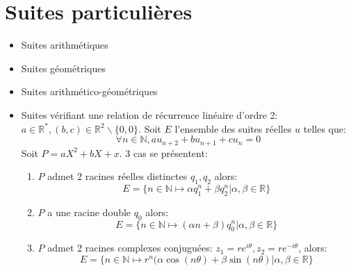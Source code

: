 \documentclass[fleqn]{article}
\begin{document}
\section{Suites particuli\`eres}
\begin{itemize}
	\item Suites arithm\'etiques
	\item Suites g\'eom\'etriques
	\item Suites arithm\'etico-g\'eom\'etriques
	\item Suites v\'erifiant une relation de r\'ecurrence lin\'eaire d'ordre 2: \\
		$a \in \mathbb{R}^*, (b,c) \in \mathbb{R}^2\backslash\{0,0\}$. Soit $E$ l'ensemble des suites r\'eelles $u$ telles que:
		\[\forall n \in \mathbb{N}, au_{n+2} + bu_{n+1} + cu_n = 0\]
		Soit $P = aX^2 + bX + x$. 3 cas se pr\'esentent:
		\begin{enumerate}
			\item $P$ admet 2 racines r\'eelles distinctes $q_1, q_2$ alors:
				\[E = \{n \in \mathbb{N} \mapsto \alpha q_1^n + \beta q_2^n | \alpha, \beta \in \mathbb{R}\}\]
			\item $P$ a une racine double $q_0$ alors:
				\[E = \{n \in \mathbb{N} \mapsto (\alpha n + \beta) q_0^n | \alpha, \beta \in \mathbb{R}\}\]
			\item $P$ admet 2 racines complexes conjugu\'ees: $z_1 = re^{i\theta}, z_2 = re^{-i\theta}$, alors:
				\[E = \{n \in \mathbb{N} \mapsto r^n(\alpha \cos(n\theta) + \beta \sin(n\theta) | \alpha, \beta \in \mathbb{R}\}\]
		\end{enumerate}
\end{itemize}
\end{document}
